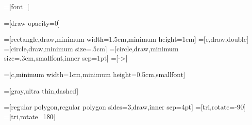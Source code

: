 \usetikzlibrary{calc}
\usetikzlibrary{external}

\usetikzlibrary{shapes.geometric}

=[font=\sffamily\footnotesize]

=[draw opacity=0]

=[rectangle,draw,minimum width=1.5cm,minimum height=1cm]
=[c,draw,double]
=[circle,draw,minimum size=.5cm]
=[circle,draw,minimum size=.3cm,smallfont,inner sep=1pt]
=[->]

=[c,minimum width=1cm,minimum height=0.5cm,smallfont]

=[gray,ultra thin,dashed]

=[regular polygon,regular polygon sides=3,draw,inner sep=4pt]
=[tri,rotate=-90]
=[tri,rotate=180]

